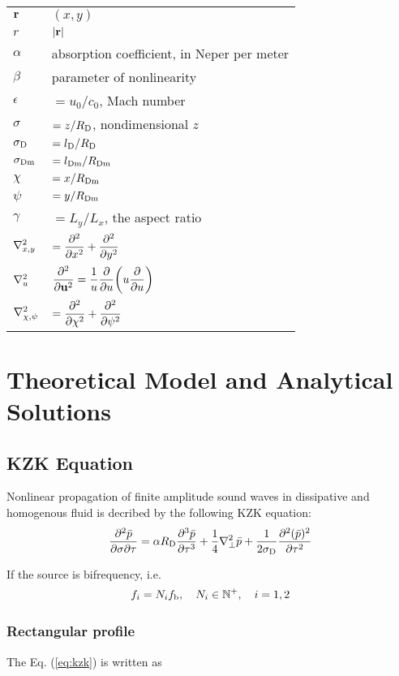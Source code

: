 \documentclass{article}
\begin{document}
\begin{tabular}{p{4cm}p{10cm}}
	$\vb{r}$ & $(x,y)$\\
	$r$ & $|\vb{r}|$\\
	$\alpha$ &absorption coefficient, in Neper per meter\\
	$\beta$ & parameter of nonlinearity\\
	$\epsilon$ & $=u_0/c_0$, Mach number\\
	$\sigma$ & $=z/R_\text{D}$, nondimensional $z$ \\
	$\sigma_\text{D}$ & $=l_\text{D}/R_\text{D}$\\
	$\sigma_\text{Dm}$ & $=l_\text{Dm}/R_\text{Dm}$\\
	$\chi$ & $=x/R_\text{Dm}$\\
	$\psi$ & $=y/R_\text{Dm}$\\
	$\gamma$ & $=L_y/L_x$, the aspect ratio\\
	$\laplacian_{x,y}$ & $\displaystyle=\pdv[2]{x} + \pdv[2]{y}$\\
	$\laplacian_{u}$ & $\displaystyle \pdv[2]{\vb{u}} = \frac{1}{u} \pdv{u} \qty(u \pdv{u})$\\
	$\laplacian_{\chi,\psi}$ & $\displaystyle=\pdv[2]{\chi} + \pdv[2]{\psi}$\\
\end{tabular}

\section{Theoretical Model and Analytical Solutions}
\subsection{KZK Equation}
Nonlinear propagation of finite amplitude sound waves in dissipative and homogenous fluid is decribed by the following KZK equation: 
\begin{align}
	\pdv{\bar{p} }{\sigma}{\tau}= \alpha R\st{D} \pdv[3]{\bar{p} }{\tau} +\frac14 \laplacian_\perp \bar{p} + \frac{1}{2\sigma\st{D}} \pdv[2]{ (\bar{p})^2}{\tau}
	\label{eq:kzk}
\end{align}

If the source is bifrequency, i.e.
\begin{align}
	f_i = N_i f\st{b}\qc N_i \in \N^+\qc i = 1,2
\end{align}

\subsubsection{Rectangular profile}
The Eq. (\ref{eq:kzk}) is written as
\end{document}
